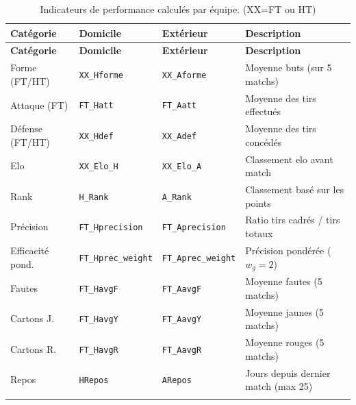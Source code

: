 \begin{longtable}{lllp{5.5cm}}
    \toprule
    \textbf{Catégorie} & \textbf{Domicile} & \textbf{Extérieur} & \textbf{Description} \\
    \midrule
    \endfirsthead
    \toprule
    \textbf{Catégorie} & \textbf{Domicile} & \textbf{Extérieur} & \textbf{Description} \\
    \midrule
    \endhead
    Forme (FT/HT)     & \texttt{XX\_Hforme}       & \texttt{XX\_Aforme}       & Moyenne buts (sur 5 matchs) \\
    Attaque (FT)      & \texttt{FT\_Hatt}         & \texttt{FT\_Aatt}         & Moyenne des tirs effectués \\
    Défense (FT/HT)   & \texttt{XX\_Hdef}         & \texttt{XX\_Adef}         & Moyenne des tirs concédés \\
    Elo               & \texttt{XX\_Elo\_H}        & \texttt{XX\_Elo\_A}        & Classement elo avant match \\
    Rank              & \texttt{H\_Rank}         & \texttt{A\_Rank}         & Classement basé sur les points  \\
    Précision         & \texttt{FT\_Hprecision}   & \texttt{FT\_Aprecision}   & Ratio tirs cadrés / tirs totaux \\
    Efficacité pond.  & \texttt{FT\_Hprec\_weight} & \texttt{FT\_Aprec\_weight} & Précision pondérée ($w_g = 2$) \\
    Fautes            & \texttt{FT\_HavgF}        & \texttt{FT\_AavgF}        & Moyenne fautes (5 matchs) \\
    Cartons J.        & \texttt{FT\_HavgY}        & \texttt{FT\_AavgY}        & Moyenne jaunes (5 matchs) \\
    Cartons R.        & \texttt{FT\_HavgR}        & \texttt{FT\_AavgR}        & Moyenne rouges (5 matchs) \\
    Repos             & \texttt{HRepos}          & \texttt{ARepos}          & Jours depuis dernier match (max 25) \\
    \bottomrule
    \caption{Indicateurs de performance calculés par équipe. (XX=FT ou HT)}
\end{longtable}

